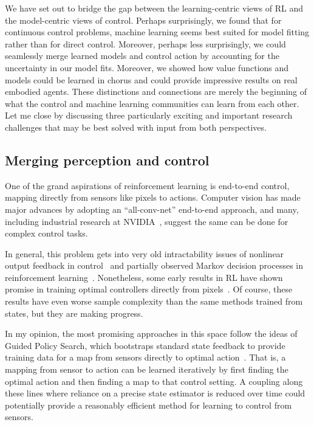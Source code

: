 \documentclass[11pt]{article}
\numberwithin{equation}{section}
\begin{document}
We have set out to bridge the gap between the learning-centric views of RL and the model-centric views of control. Perhaps surprisingly, we found that for continuous control problems, machine learning seems best suited for model fitting rather than for direct control. Moreover, perhaps less surprisingly, we could seamlessly merge learned models and control action by accounting for the uncertainty in our model fits. Moreover, we showed how value functions and models could be learned in chorus and could provide impressive results on real embodied agents. These distinctions and connections are merely the beginning of what the control and machine learning communities can learn from each other. Let me close by discussing three particularly exciting and important research challenges that may be best solved with input from both perspectives.

\subsection{Merging perception and control}

One of the grand aspirations of reinforcement learning is end-to-end control, mapping directly from sensors like pixels to actions. Computer vision has made major advances by adopting an ``all-conv-net'' end-to-end approach, and many, including industrial research at NVIDIA~\cite{bojarski2016end}, suggest the same can be done for complex control tasks.

In general, this problem gets into very old intractability issues of nonlinear output feedback in control~\cite{blondel2000survey} and partially observed Markov decision processes in reinforcement learning~\cite{papadimitriou1987complexity}. Nonetheless, some early results in RL have shown promise in training optimal controllers directly from pixels~\cite{lillicrap2015continuous,mnih2015human}. Of course, these results have even worse sample complexity than the same methods trained from states, but they are making progress. 

In my opinion, the most promising approaches in this space follow the ideas of Guided Policy Search, which bootstraps standard state feedback to provide training data for a map from sensors directly to optimal action~\cite{levine2013guided,Levine16}. That is, a mapping from sensor to action can be learned iteratively by first finding the optimal action and then finding a map to that control setting. A coupling along these lines where reliance on a precise state estimator is reduced over time could potentially provide a reasonably efficient method for learning to control from sensors.
\end{document}
